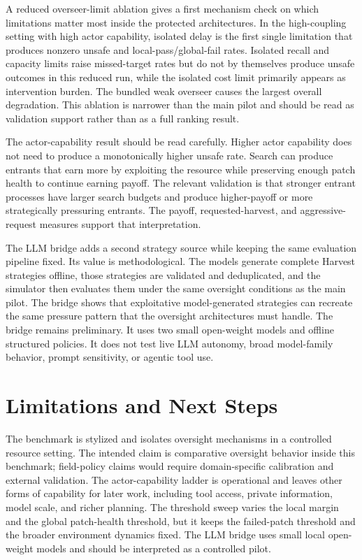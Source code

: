 \documentclass[11pt]{article}
\begin{document}
A reduced overseer-limit ablation gives a first mechanism check on which limitations matter most inside the protected architectures. In the high-coupling setting with high actor capability, isolated delay is the first single limitation that produces nonzero unsafe and local-pass/global-fail rates. Isolated recall and capacity limits raise missed-target rates but do not by themselves produce unsafe outcomes in this reduced run, while the isolated cost limit primarily appears as intervention burden. The bundled weak overseer causes the largest overall degradation. This ablation is narrower than the main pilot and should be read as validation support rather than as a full ranking result.

The actor-capability result should be read carefully. Higher actor capability does not need to produce a monotonically higher unsafe rate. Search can produce entrants that earn more by exploiting the resource while preserving enough patch health to continue earning payoff. The relevant validation is that stronger entrant processes have larger search budgets and produce higher-payoff or more strategically pressuring entrants. The payoff, requested-harvest, and aggressive-request measures support that interpretation.

The LLM bridge adds a second strategy source while keeping the same evaluation pipeline fixed. Its value is methodological. The models generate complete Harvest strategies offline, those strategies are validated and deduplicated, and the simulator then evaluates them under the same oversight conditions as the main pilot. The bridge shows that exploitative model-generated strategies can recreate the same pressure pattern that the oversight architectures must handle. The bridge remains preliminary. It uses two small open-weight models and offline structured policies. It does not test live LLM autonomy, broad model-family behavior, prompt sensitivity, or agentic tool use.

\section{Limitations and Next Steps}

The benchmark is stylized and isolates oversight mechanisms in a controlled resource setting. The intended claim is comparative oversight behavior inside this benchmark; field-policy claims would require domain-specific calibration and external validation. The actor-capability ladder is operational and leaves other forms of capability for later work, including tool access, private information, model scale, and richer planning. The threshold sweep varies the local margin and the global patch-health threshold, but it keeps the failed-patch threshold and the broader environment dynamics fixed. The LLM bridge uses small local open-weight models and should be interpreted as a controlled pilot.
\end{document}
